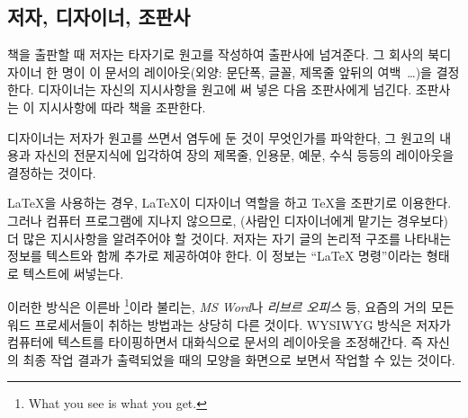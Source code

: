 \subsection{저자, 디자이너, 조판사}

책을 출판할 때 저자는 타자기로 원고를 작성하여 출판사에
넘겨준다. 그 회사의 북디자이너 한 명이 이 문서의
레이아웃(외양: 문단폭, 글꼴, 제목줄 앞뒤의 여백~\ldots)을
결정한다. 디자이너는 자신의 지시사항을 원고에 써 넣은 다음
조판사에게 넘긴다. 조판사는 이 지시사항에 따라 책을 조판한다. 

디자이너는 저자가 원고를 쓰면서 염두에 둔 것이 무엇인가를
파악한다, 그 원고의 내용과 자신의 전문지식에 입각하여 장의
제목줄, 인용문, 예문, 수식 등등의 레이아웃을 결정하는 것이다.

\LaTeX{}을 사용하는 경우, \LaTeX{}이 디자이너 역할을 하고
\TeX{}을 조판기로 이용한다. 그러나  컴퓨터 프로그램에
지나지 않으므로, (사람인 디자이너에게 맡기는 경우보다) 더 많은
지시사항을 알려주어야 할 것이다. 저자는 자기 글의 논리적 구조를
나타내는 정보를 텍스트와 함께 추가로 제공하여야 한다. 이 정보는
``\LaTeX{} 명령''이라는 형태로 텍스트에 써넣는다.

이러한 방식은 이른바 \footnote{What you see is
  what you get.}이라 불리는,
\emph{MS Word}나 \emph{리브르 오피스}
등, 요즘의 거의 모든 워드 프로세서들이 취하는 방법과는 상당히 다른
것이다. WYSIWYG 방식은 저자가 컴퓨터에 텍스트를 타이핑하면서
대화식으로 문서의 레이아웃을 조정해간다. 즉 자신의 최종 작업
결과가 출력되었을 때의 모양을 화면으로 보면서 작업할 수 있는
것이다.

